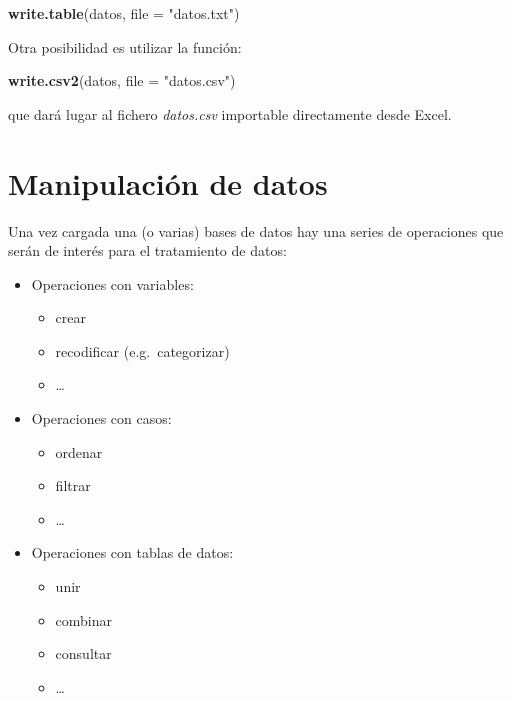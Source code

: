 \documentclass[
]{book}
\newenvironment{Shaded}{\begin{snugshade}}{\end{snugshade}}
\newcommand{\AttributeTok}[1]{\textcolor[rgb]{0.13,0.29,0.53}{#1}}
\newcommand{\FunctionTok}[1]{\textcolor[rgb]{0.13,0.29,0.53}{\textbf{#1}}}
\newcommand{\NormalTok}[1]{#1}
\newcommand{\StringTok}[1]{\textcolor[rgb]{0.31,0.60,0.02}{#1}}
\providecommand{\tightlist}{%
  \setlength{\itemsep}{0pt}\setlength{\parskip}{0pt}}
\begin{document}
\begin{Shaded}
\begin{Highlighting}[]
\FunctionTok{write.table}\NormalTok{(datos, }\AttributeTok{file =} \StringTok{"datos.txt"}\NormalTok{)}
\end{Highlighting}
\end{Shaded}

Otra posibilidad es utilizar la función:

\begin{Shaded}
\begin{Highlighting}[]
\FunctionTok{write.csv2}\NormalTok{(datos, }\AttributeTok{file =} \StringTok{"datos.csv"}\NormalTok{)}
\end{Highlighting}
\end{Shaded}

que dará lugar al fichero \emph{datos.csv} importable directamente desde Excel.

\section{Manipulación de datos}\label{manipulaciuxf3n-de-datos}

Una vez cargada una (o varias) bases
de datos hay una series de operaciones que serán de interés para el
tratamiento de datos:

\begin{itemize}
\tightlist
\item
  Operaciones con variables:

  \begin{itemize}
  \tightlist
  \item
    crear
  \item
    recodificar (e.g.~categorizar)
  \item
    \ldots{}
  \end{itemize}
\item
  Operaciones con casos:

  \begin{itemize}
  \tightlist
  \item
    ordenar
  \item
    filtrar
  \item
    \ldots{}
  \end{itemize}
\item
  Operaciones con tablas de datos:

  \begin{itemize}
  \tightlist
  \item
    unir
  \item
    combinar
  \item
    consultar
  \item
    \ldots{}
  \end{itemize}
\end{itemize}
\end{document}
